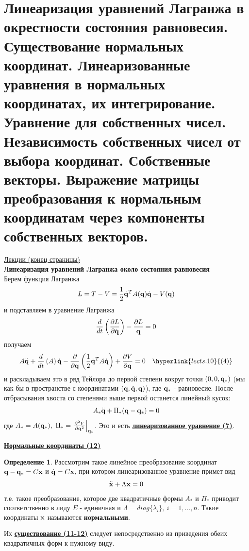 \documentclass[specialist, subf, href, colorlinks=true, 12pt, times, mtpro, final]{disser}
\theoremstyle{definition}
\newtheorem{defn}{Определение}[section]
\begin{document}
    \section{Линеаризация уравнений Лагранжа в окрестности состояния равновесия. Существование нормальных координат. Линеаризованные уравнения в нормальных координатах, их интегрирование. Уравнение для собственных чисел. Независимость собственных чисел от выбора координат. Собственные векторы. Выражение матрицы преобразования к нормальным координатам через компоненты собственных векторов.}
     \label{12}
    \hyperlink {lects.11}{Лекции (конец страницы)} \\
    
    \textbf{Линеаризация уравнений Лагранжа около состояния равновесия} \\
    Берем функция Лагранжа
    $$
   		L = T - V = \frac{1}{2}\dot{\mathbf{q}}^T A(\mathbf{q}) \dot{\mathbf{q}} - V(\mathbf{q})
    $$
    и подставляем в уравнение Лагранжа
    $$
    	\frac{d}{dt}\left( \frac{\partial L}{\partial \dot{\mathbf{q}}} \right) - \frac{\partial L}{\mathbf{q}} = 0
    $$
    получаем 
    $$
    	A \overset{..}{\bfq} + \frac{d}{dt}\left( A \right) \dot{\bfq} - \frac{\partial}{\partial \bfq} \left(\frac{1}{2} \dot{\bfq}^T A \dot{\bfq} \right) + \frac{\partial V}{\partial \bfq} = 0 \ \ \ \hyperlink {lects.10}{(4)}
    $$
    и раскладываем это в ряд Тейлора до первой степени вокруг точки $(0,0,\mathbf{q}_*)$ (мы как бы в пространстве с координатами $(\overset{..}{\mathbf{q}}, \dot{\mathbf{q}}, \mathbf{q})$), где $\mathbf{q}_*$ - равновесие. После отбрасывания хвоста со степенями выше первой останется линейный кусок:
    $$
    	A_* \overset{..}{\mathbf{q}} + \Pi_* (\mathbf{q} - \mathbf{q}_*) = 0
    $$
    где $A_* = A(\mathbf{q}_*), \ \Pi_* = \left. \frac{\partial^2 V}{\partial \mathbf{q}^2} \right|_{\mathbf{q}_*}$. Это и есть \textbf{\hyperlink{lects.12}{линеаризованное уравнение (7)}}.
    
    \bigskip  
    \textbf{\hyperlink{lects.12}{Нормальные координаты (12)}}
    \begin{defn}
    	Рассмотрим такое линейное преобразование координат $\mathbf{q} - \mathbf{q}_* = C\mathbf{x}$ и $\dot{\mathbf{q}} = C\mathbf{x}$, при котором линеаризованное уравнение примет вид
    	$$
    		\overset{..}{\mathbf{x}} + \Lambda \mathbf{x} = 0
    	$$ 
    	т.е. такое преобразование, которое две квадратичные формы $A_*$ и $\Pi_*$ приводит соответственно в лиду $E$ - единичная и $\Lambda = diag\{\lambda_i\}, \ i = 1,...,n$. Такие координаты $\mathbf{x}$ называются \textbf{нормальными}.
    \end{defn}  
	Их \textbf{\hyperlink{lects.12}{существование (11-12)}} следует непосредственно из приведения обеих квадратичных форм к нужному виду.
	
\end{document}
